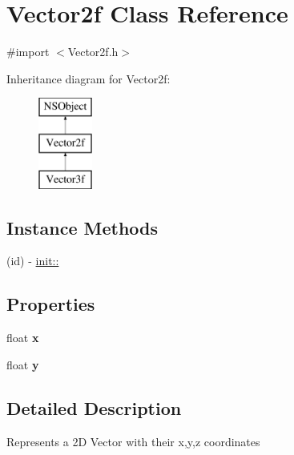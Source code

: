 \hypertarget{interface_vector2f}{}\section{Vector2f Class Reference}
\label{interface_vector2f}


{\ttfamily \#import $<$Vector2f.\+h$>$}

Inheritance diagram for Vector2f\+:\begin{figure}[H]
\begin{center}
\leavevmode
\includegraphics[height=3.000000cm]{interface_vector2f}
\end{center}
\end{figure}
\subsection*{Instance Methods}
\begin{DoxyCompactItemize}
\item 
(id) -\/ \hyperlink{interface_vector2f_aa75e63432eac74b4e29d6f926cd68fad}{init\+::}
\end{DoxyCompactItemize}
\subsection*{Properties}
\begin{DoxyCompactItemize}
\item 
float {\bfseries x}\hypertarget{interface_vector2f_add58d2378e3a3abdb76cf0ac51c9acfc}{}\label{interface_vector2f_add58d2378e3a3abdb76cf0ac51c9acfc}

\item 
float {\bfseries y}\hypertarget{interface_vector2f_a14874a72597fd358b15f8ba34b999c4d}{}\label{interface_vector2f_a14874a72597fd358b15f8ba34b999c4d}

\end{DoxyCompactItemize}


\subsection{Detailed Description}
Represents a 2D Vector with their x,y,z coordinates 

